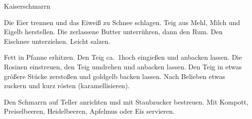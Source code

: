 \begin{recipe}{Kaiserschmarrn}
%
%
%
%

\begin{ingredients}
\end{ingredients}

\begin{instructions}
    Die Eier trennen und das Eiweiß zu Schnee schlagen.
    Teig aus Mehl, Milch und Eigelb herstellen.
    Die zerlassene Butter unterrühren, dann den Rum.
    Den Eischnee unterziehen.
    Leicht salzen.

    Fett in Pfanne erhitzen.
    Den Teig ca.\ 1\cm hoch eingießen und anbacken lassen.
    Die Rosinen einstreuen, den Teig umdrehen und anbacken lassen.
    Den Teig in etwas größere Stücke zerstoßen und goldgelb backen lassen.
    Nach Belieben etwas zuckern und kurz rösten (karamellisieren).

    Den Schmarrn auf Teller anrichten und mit Staubzucker bestreuen.
    Mit Kompott, Preiselbeeren, Heidelbeeren, Apfelmus oder Eis servieren.
\end{instructions}
\end{recipe}
